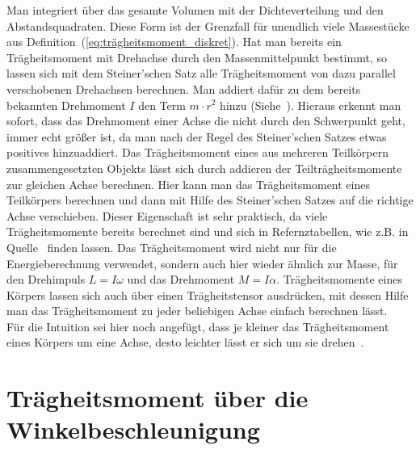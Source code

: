 \documentclass{article}
\begin{document}
		Man integriert über das gesamte Volumen mit der Dichteverteilung und den Abstandsquadraten. Diese Form ist der Grenzfall für unendlich viele Massestücke aus Definition~(\ref{eq:trägheitsmoment_diskret}).
		Hat man bereits ein Trägheitsmoment mit Drehachse durch den Massenmittelpunkt bestimmt, so lassen sich mit dem Steiner'schen Satz alle Trägheitsmoment von dazu parallel verschobenen Drehachsen berechnen.
		Man addiert dafür zu dem bereits bekannten Drehmoment \(I\) den Term \(m \cdot r^2\) hinzu (Siehe~\cite{Steiner}). Hieraus erkennt man sofort, dass das Drehmoment einer Achse die nicht 
		durch den Schwerpunkt geht, immer echt größer ist, da man nach der Regel des Steiner'schen Satzes etwas positives hinzuaddiert.
		Das Trägheitsmoment eines aus mehreren Teilkörpern zusammengesetzten Objekts lässt sich durch addieren der Teilträgheitsmomente zur gleichen Achse berechnen.
		Hier kann man das Trägheitsmoment eines Teilkörpers berechnen und dann mit Hilfe des Steiner'schen Satzes auf die richtige Achse verschieben.
		Dieser Eigenschaft ist sehr praktisch, da viele Trägheitsmomente bereits berechnet sind und sich in Refernztabellen, wie z.B. in Quelle~\cite{HallidayPhysik} finden lassen.
		Das Trägheitsmoment wird nicht nur für die Energieberechnung verwendet, sondern auch hier wieder ähnlich zur Masse, für den Drehimpuls \(L = I \omega \) und das Drehmoment \(M = I \alpha \).
		Trägheitsmomente eines Körpers lassen sich auch über einen Trägheitstensor ausdrücken, mit dessen Hilfe man das Trägheitsmoment zu jeder beliebigen Achse einfach berechnen lässt. \\
		Für die Intuition sei hier noch angefügt, dass je kleiner das Trägheitsmoment eines Körpers um eine Achse, desto leichter lässt er sich um sie drehen~\cite{HallidayPhysik}.

	\section{Trägheitsmoment über die Winkelbeschleunigung}
\end{document}
